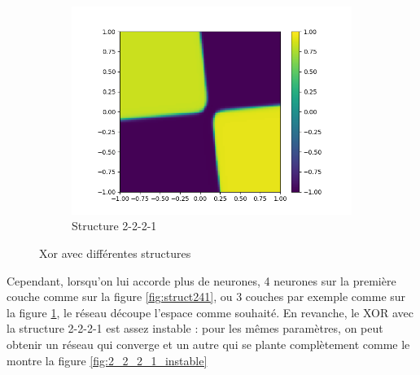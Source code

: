 \begin{figure}[h!]
\begin{subfigure}[b]{.3\linewidth}
    \includegraphics[width=\linewidth]{fig/xor2221_eta05.png}
    \caption{Structure 2-2-2-1}
    \label{fig:struct2221}
  \end{subfigure}
  \caption{Xor avec différentes structures}
  \label{structxor}
\end{figure}

Cependant, lorsqu'on lui accorde plus de neurones, 4 neurones sur la première couche comme sur la figure \ref{fig:struct241}, ou 3 couches par exemple comme sur la figure \ref{fig:struct2221}, le réseau découpe l'espace comme souhaité. En revanche, le XOR avec la structure 2-2-2-1 est assez instable : pour les mêmes paramètres, on peut obtenir un réseau qui converge et un autre qui se plante complètement comme le montre la figure \ref{fig:2_2_2_1_instable}
	
